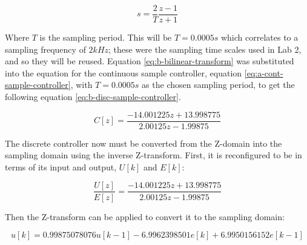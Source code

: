 \documentclass[11pt, letterpaper]{article}
\begin{document}
\begin{equation}
  \label{eq:b-bilinear-transform}
  s = \frac{2}{T}\frac{z-1}{z+1}
\end{equation}

Where $T$ is the sampling period. This will be $T = 0.0005s$ which correlates to a sampling frequency of $2 kHz$;
these were the sampling time scales used in Lab 2, and so they will be reused. Equation \ref{eq:b-bilinear-transform}
was substituted into the equation for the continuous sample controller, equation \ref{eq:a-cont-sample-controller},
with $T = 0.0005s$ as the chosen sampling period, to get the following equation \ref{eq:b-disc-sample-controller}.

\begin{equation}
  \label{eq:b-disc-sample-controller}
  C[z] = \frac{-14.001225z + 13.998775}{2.00125z - 1.99875}
\end{equation}

The discrete controller now must be converted from the Z-domain into
the sampling domain using the inverse Z-transform. First, it is
reconfigured to be in terms of its input and output, $U[k]$ and $E[k]$:

\begin{equation}
  \frac{U[z]}{E[z]} = \frac{-14.001225z + 13.998775}{2.00125z - 1.99875}
\end{equation}

Then the Z-transform can be applied to convert it to the sampling domain:

\begin{equation}
  u[k] = 0.99875078076u[k - 1] - 6.9962398501e[k] + 6.9950156152e[k-1]
\end{equation}
\end{document}
